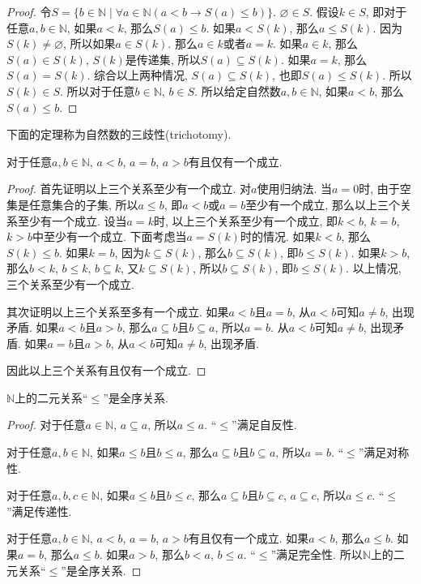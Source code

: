 \begin{proof}
	令$S=\{b\in \mathbb N\mid \forall a\in \mathbb N(a<b\rightarrow S(a)\leqslant b)\}$. $\varnothing \in S$. 假设$k\in S$, 即对于任意$a,b\in \mathbb N$, 如果$a<k$, 那么$S(a)\leqslant b$. 如果$a<S(k)$, 那么$a\leqslant S(k)$. 因为$S(k)\neq \varnothing$, 所以如果$a\in S(k)$. 那么$a\in k$或者$a=k$. 如果$a\in k$, 那么$S(a)\in S(k)$, $S(k)$是传递集, 所以$S(a)\subseteq S(k)$. 如果$a=k$, 那么$S(a)=S(k)$. 综合以上两种情况, $S(a)\subseteq S(k)$, 也即$S(a)\leqslant S(k)$. 所以$S(k)\in S$. 所以对于任意$b\in \mathbb N$, $b\in S$. 所以给定自然数$a,b\in \mathbb N$, 如果$a<b$, 那么$S(a)\leqslant b$.
\end{proof}

下面的定理称为自然数的三歧性(trichotomy).
\begin{theorem}[自然数的三歧性]
	对于任意$a,b\in \mathbb N$, $a<b$, $a=b$, $a>b$有且仅有一个成立.
\end{theorem}

\begin{proof}
	首先证明以上三个关系至少有一个成立. 对$a$使用归纳法. 当$a=0$时, 由于空集是任意集合的子集, 所以$a\leqslant b$, 即$a<b$或$a=b$至少有一个成立, 那么以上三个关系至少有一个成立. 设当$a=k$时, 以上三个关系至少有一个成立, 即$k<b$, $k=b$, $k>b$中至少有一个成立. 下面考虑当$a=S(k)$时的情况. 如果$k<b$, 那么$S(k)\leqslant b$. 如果$k=b$, 因为$k\subseteq S(k)$, 那么$b\subseteq S(k)$, 即$b\leqslant S(k)$. 如果$k>b$, 那么$b<k$, $b\leqslant k$, $b\subseteq k$, 又$k\subseteq S(k)$, 所以$b\subseteq S(k)$, 即$b\leqslant S(k)$. 以上情况, 三个关系至少有一个成立.

	其次证明以上三个关系至多有一个成立. 如果$a<b$且$a=b$, 从$a<b$可知$a\neq b$, 出现矛盾. 如果$a<b$且$a>b$, 那么$a\subseteq b$且$b\subseteq a$, 所以$a=b$. 从$a<b$可知$a\neq b$, 出现矛盾. 如果$a=b$且$a>b$, 从$a<b$可知$a\neq b$, 出现矛盾.

	因此以上三个关系有且仅有一个成立. 
\end{proof}

\begin{theorem}
	$\mathbb N$上的二元关系``$\leqslant$''是全序关系.
\end{theorem}

\begin{proof}
	对于任意$a\in \mathbb N$, $a\subseteq a$, 所以$a\leqslant a$. ``$\leqslant$''满足自反性.
	
	对于任意$a,b\in \mathbb N$, 如果$a\leqslant b$且$b\leqslant a$, 那么$a\subseteq b$且$b\subseteq a$, 所以$a=b$. ``$\leqslant$''满足对称性.
	
	对于任意$a,b,c\in \mathbb N$, 如果$a\leqslant b$且$b\leqslant c$, 那么$a\subseteq b$且$b\subseteq c$, $a\subseteq c$, 所以$a\leqslant c$. ``$\leqslant$''满足传递性.

	对于任意$a,b\in \mathbb N$, $a<b$, $a=b$, $a>b$有且仅有一个成立. 如果$a<b$, 那么$a\leqslant b$. 如果$a=b$, 那么$a\leqslant b$. 如果$a>b$, 那么$b<a$, $b\leqslant a$. ``$\leqslant$''满足完全性.
	所以$\mathbb N$上的二元关系``$\leqslant$''是全序关系.
\end{proof}


